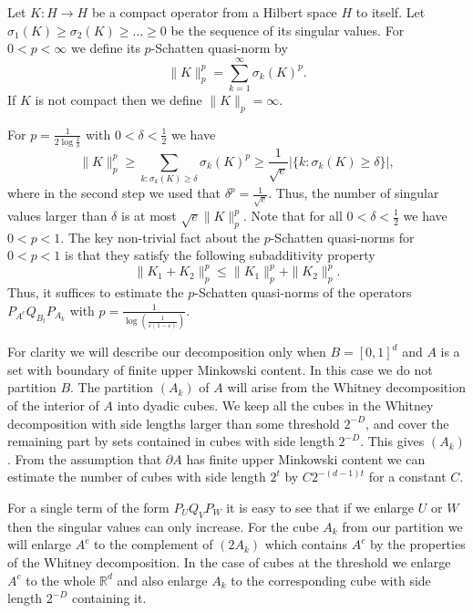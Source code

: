 \documentclass[12pt]{amsart}
\numberwithin{equation}{section}
\newcommand{\R}{\mathbb{R}}
\newcommand{\eps}{\varepsilon}
\begin{document}
Let $K:H\to H$ be a compact operator from a Hilbert space $H$ to itself. Let $\sigma_1(K) \ge \sigma_2(K) \ge \ldots \ge 0$ be the sequence of its singular values. For $0 < p < \infty$ we define its $p$-Schatten quasi-norm by
$$\|K\|_p^p = \sum_{k=1}^\infty \sigma_k(K)^p.$$
If $K$ is not compact then we define $\|K\|_p = \infty$.

For $p = \frac{1}{2\log \frac{1}{\delta}}$ with $0<\delta<\frac{1}{2}$ we have 
\begin{equation}\label{schatten to count}
\|K\|_p^p \ge \sum_{k: \sigma_k(K)\ge \delta} \sigma_k(K)^p \ge \frac{1}{\sqrt{e}}|\{k: \sigma_k(K) \ge \delta\}|,
\end{equation}
where in the second step we used that $\delta^p = \frac{1}{\sqrt{e}}$. Thus, the number of singular values larger than $\delta$ is at most $\sqrt{e}\|K\|_p^p$. Note that for all $0 < \delta < \frac{1}{2}$ we have $0 < p < 1$. The key non-trivial fact \cite[Theorem 11.5.9]{Birman_Solomyak} about the $p$-Schatten quasi-norms for $0 < p < 1$ is that they satisfy the following subadditivity property
\begin{equation}\label{quasi norm subadditive}
\|K_1+K_2\|_p^p \le \|K_1\|_p^p + \|K_2\|_p^p.   
\end{equation}
Thus, it suffices to estimate the $p$-Schatten quasi-norms of the operators $P_{A^c}Q_{B_l}P_{A_k}$ with $p = \frac{1}{\log(\frac{1}{\eps(1-\eps)})}$.

For clarity we will describe our decomposition only when $B = [0, 1]^d$ and $A$ is a set with boundary of finite upper Minkowski content. In this case we do not partition $B$. The partition $(A_k)$ of $A$ will arise from the Whitney decomposition of the interior of $A$ into dyadic cubes. We keep all the cubes in the Whitney decomposition with side lengths larger than some threshold $2^{-D}$, and cover the remaining part by sets contained in cubes with side length $2^{-D}$. This gives $(A_k)$. From the assumption that $\partial A$ has finite upper Minkowski content we can estimate the number of cubes with side length $2^t$ by $C2^{-(d-1)t}$ for a constant $C$.

For a single term of the form $P_{U}Q_{V}P_{W}$ it is easy to see that if we enlarge $U$ or $W$ then the singular values can only increase.  For the cube $A_k$ from our partition we will enlarge $A^c$ to the complement of $(2A_k)$ which contains $A^c$ by the properties of the Whitney decomposition. In the case of cubes at the threshold we enlarge $A^c$ to the whole $\R^d$ and also enlarge $A_k$ to the corresponding cube with side length $2^{-D}$ containing it.
\end{document}
